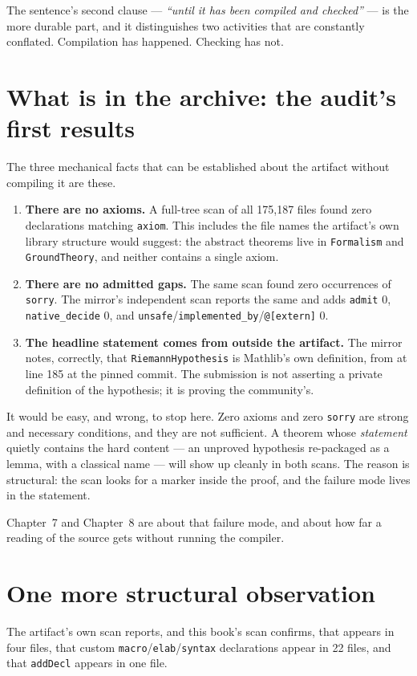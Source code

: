 The sentence's second clause --- \emph{``until it has been compiled and
checked''} --- is the more durable part, and it distinguishes two activities
that are constantly conflated. Compilation has happened. Checking has not.

\section{What is in the archive: the audit's first results}The three mechanical facts that can be established about the artifact without
compiling it are these.

\begin{enumerate}
\item \textbf{There are no axioms.} A full-tree scan of all 175{,}187 files
found zero declarations matching \texttt{axiom}. This includes the file names
the artifact's own library structure would suggest: the abstract theorems live
in \texttt{Formalism} and \texttt{GroundTheory}, and neither contains a single
axiom.
\item \textbf{There are no admitted gaps.} The same scan found zero
occurrences of \texttt{sorry}. The mirror's independent scan reports the same
and adds \texttt{admit} 0, \texttt{native\_decide} 0, and
\texttt{unsafe}/\texttt{implemented\_by}/\texttt{@[extern]} 0.
\item \textbf{The headline statement comes from outside the artifact.} The
mirror notes, correctly, that \texttt{RiemannHypothesis} is Mathlib's own
definition, from
 at line 185 at the
pinned commit. The submission is not asserting a private definition of the
hypothesis; it is proving the community's.
\end{enumerate}

It would be easy, and wrong, to stop here. Zero axioms and zero \texttt{sorry}
are strong and necessary conditions, and they are not sufficient. A theorem
whose \emph{statement} quietly contains the hard content --- an unproved
hypothesis re-packaged as a lemma, with a classical name --- will show up
cleanly in both scans. The reason is structural: the scan looks for a marker
inside the proof, and the failure mode lives in the statement.

Chapter~7 and Chapter~8 are about that failure mode, and about how far a
reading of the source gets without running the compiler.

\section{One more structural observation}The artifact's own scan reports, and this book's scan confirms, that
 appears in four files, that custom
\texttt{macro}/\texttt{elab}/\texttt{syntax} declarations appear in 22 files,
and that \texttt{addDecl} appears in one file.

